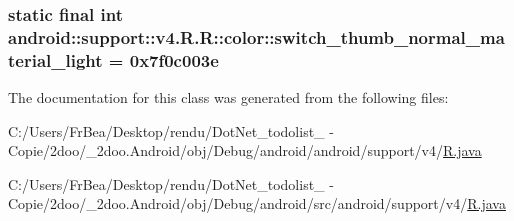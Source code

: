 \hypertarget{classandroid_1_1support_1_1v4_1_1_r_1_1color_8504cc9577bad9a64d4a6c184e304a29}{
\subsubsection[{switch\_\-thumb\_\-normal\_\-material\_\-light}]{\setlength{\rightskip}{0pt plus 5cm}static final int android::support::v4.R.R::color::switch\_\-thumb\_\-normal\_\-material\_\-light = 0x7f0c003e}}
\label{classandroid_1_1support_1_1v4_1_1_r_1_1color_8504cc9577bad9a64d4a6c184e304a29}




The documentation for this class was generated from the following files:\begin{CompactItemize}
\item 
C:/Users/FrBea/Desktop/rendu/DotNet\_\-todolist\_ - Copie/2doo/\_\-2doo.Android/obj/Debug/android/android/support/v4/\hyperlink{android_2support_2v4_2_r_8java}{R.java}\item 
C:/Users/FrBea/Desktop/rendu/DotNet\_\-todolist\_ - Copie/2doo/\_\-2doo.Android/obj/Debug/android/src/android/support/v4/\hyperlink{src_2android_2support_2v4_2_r_8java}{R.java}\end{CompactItemize}
